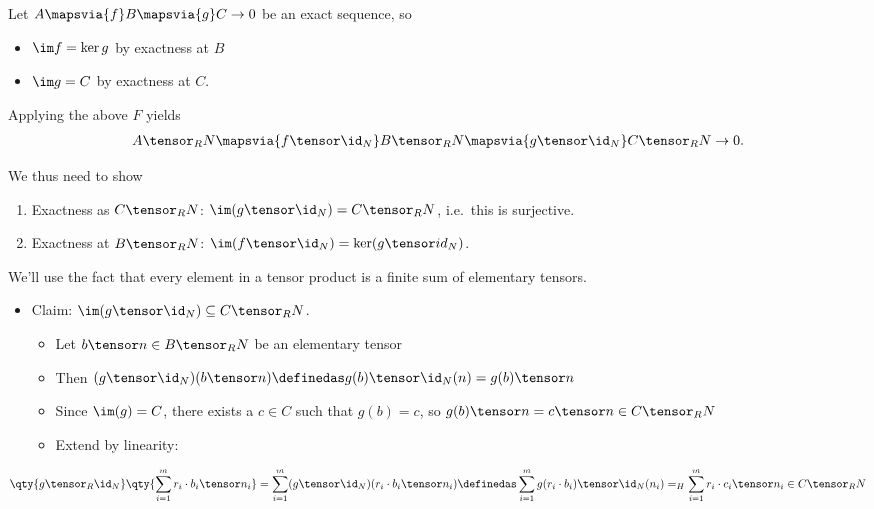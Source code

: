 Let \(A\mapsvia{f} B \mapsvia{g} C \to 0\) be an exact sequence, so

\begin{itemize}
\tightlist
\item
  \(\im f = \ker g\) by exactness at \(B\)
\item
  \(\im g = C\) by exactness at \(C\).
\end{itemize}

Applying the above \(F\) yields \begin{align*}
A\tensor_R N \mapsvia{f\tensor \id_N} B\tensor_R N \mapsvia{g\tensor \id_N} C\tensor_R N \to 0
.\end{align*}

We thus need to show

\begin{enumerate}
\def\labelenumi{\arabic{enumi}.}
\tightlist
\item
  Exactness as \(C\tensor_R N\): \(\im(g\tensor \id_N) = C\tensor_R N\),
  i.e.~this is surjective.
\item
  Exactness at \(B\tensor_R N\):
  \(\im(f\tensor \id_N) = \ker(g\tensor id_N)\).
\end{enumerate}

We'll use the fact that every element in a tensor product is a finite
sum of elementary tensors.

\begin{itemize}
\tightlist
\item
  Claim: \(\im(g\tensor \id_N) \subseteq C\tensor_R N\).

  \begin{itemize}
  \tightlist
  \item
    Let \(b\tensor n \in B\tensor_R N\) be an elementary tensor
  \item
    Then
    \((g\tensor \id_N)(b\tensor n) \definedas g(b) \tensor \id_N (n) = g(b) \tensor n\)
  \item
    Since \(\im(g) = C\), there exists a \(c\in C\) such that
    \(g(b) = c\), so \(g(b) \tensor n = c \tensor n \in C\tensor_R N\)
  \item
    Extend by linearity:
  \end{itemize}
\end{itemize}

\begin{align*}
\qty{g\tensor_R \id_N}\qty{\sum_{i=1}^m r_i \cdot b_i \tensor n_i} =\sum_{i=1}^m (g\tensor \id_N)(r_i\cdot b_i \tensor n_i) \definedas \sum_{i=1}^m g(r_i\cdot b_i) \tensor \id_N(n_i) =_H \sum_{i=1}^m r_i\cdot c_i \tensor n_i \in C\tensor_R N
\end{align*}

